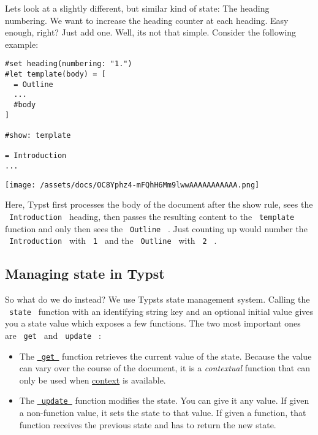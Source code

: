 Let\textquotesingle s look at a slightly different, but similar kind of
state: The heading numbering. We want to increase the heading counter at
each heading. Easy enough, right? Just add one. Well,
it\textquotesingle s not that simple. Consider the following example:

\begin{verbatim}
#set heading(numbering: "1.")
#let template(body) = [
  = Outline
  ...
  #body
]

#show: template

= Introduction
...
\end{verbatim}

\texttt{[image: /assets/docs/OC8Yphz4-mFQhH6Mm9lwwAAAAAAAAAAA.png]}

Here, Typst first processes the body of the document after the show
rule, sees the \texttt{\ Introduction\ } heading, then passes the
resulting content to the \texttt{\ template\ } function and only then
sees the \texttt{\ Outline\ } . Just counting up would number the
\texttt{\ Introduction\ } with \texttt{\ 1\ } and the
\texttt{\ Outline\ } with \texttt{\ 2\ } .

\subsection{Managing state in Typst}\label{state-in-typst}

So what do we do instead? We use Typst\textquotesingle s state
management system. Calling the \texttt{\ state\ } function with an
identifying string key and an optional initial value gives you a state
value which exposes a few functions. The two most important ones are
\texttt{\ get\ } and \texttt{\ update\ } :

\begin{itemize}
\item
  The
  \href{/docs/reference/introspection/state/\#definitions-get}{\texttt{\ get\ }}
  function retrieves the current value of the state. Because the value
  can vary over the course of the document, it is a \emph{contextual}
  function that can only be used when
  \href{/docs/reference/context/}{context} is available.
\item
  The
  \href{/docs/reference/introspection/state/\#definitions-update}{\texttt{\ update\ }}
  function modifies the state. You can give it any value. If given a
  non-function value, it sets the state to that value. If given a
  function, that function receives the previous state and has to return
  the new state.
\end{itemize}

